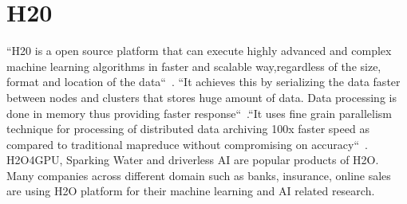 \section{H20}


``H20 is a open source platform that can execute highly advanced 
and complex machine learning algorithms in faster and scalable 
way,regardless of the size, format and location of the 
data``~\cite{hid-sp18-523-www-h2o}. ``It achieves this by serializing 
the data faster between nodes and clusters that stores huge amount 
of data. Data processing is done in memory thus providing faster 
response``~\cite{hid-sp18-523-www-h2o}.``It uses fine grain parallelism 
technique for processing of distributed data archiving 100x faster 
speed as compared to traditional mapreduce without compromising 
on accuracy``~\cite{hid-sp18-523-www-h2o}. H2O4GPU, Sparking Water
and driverless AI are popular products of H2O. Many companies
across different domain such as banks, insurance, online sales 
are using H2O platform for their machine learning and AI related
research.





